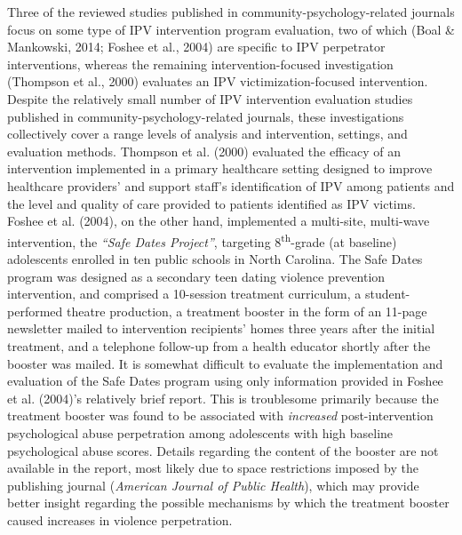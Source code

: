 \documentclass[11pt,]{tufte-book}
\begin{document}
Three of the reviewed studies published in community-psychology-related
journals focus on some type of IPV intervention program evaluation, two
of which (Boal \& Mankowski, 2014; Foshee et al., 2004) are specific to
IPV perpetrator interventions, whereas the remaining
intervention-focused investigation (Thompson et al., 2000) evaluates an
IPV victimization-focused intervention. Despite the relatively small
number of IPV intervention evaluation studies published in
community-psychology-related journals, these investigations collectively
cover a range levels of analysis and intervention, settings, and
evaluation methods. Thompson et al. (2000) evaluated the efficacy of an
intervention implemented in a primary healthcare setting designed to
improve healthcare providers' and support staff's identification of IPV
among patients and the level and quality of care provided to patients
identified as IPV victims. Foshee et al. (2004), on the other hand,
implemented a multi-site, multi-wave intervention, the \emph{``Safe
Dates Project''}, targeting 8\textsuperscript{th}-grade (at baseline)
adolescents enrolled in ten public schools in North Carolina. The Safe
Dates program was designed as a secondary teen dating violence
prevention intervention, and comprised a 10-session treatment
curriculum, a student-performed theatre production, a treatment booster
in the form of an 11-page newsletter mailed to intervention recipients'
homes three years after the initial treatment, and a telephone follow-up
from a health educator shortly after the booster was mailed. It is
somewhat difficult to evaluate the implementation and evaluation of the
Safe Dates program using only information provided in Foshee et al.
(2004)'s relatively brief report. This is troublesome primarily because
the treatment booster was found to be associated with \emph{increased}
post-intervention psychological abuse perpetration among adolescents
with high baseline psychological abuse scores. Details regarding the
content of the booster are not available in the report, most likely due
to space restrictions imposed by the publishing journal (\emph{American
Journal of Public Health}), which may provide better insight regarding
the possible mechanisms by which the treatment booster caused increases
in violence perpetration.
\end{document}
